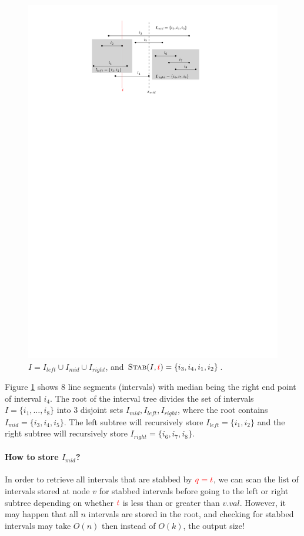 \begin{figure}[ht!]
\centering
\includegraphics[scale=.8]{ipe/stabbing-line.pdf}
\caption{ $I = I_{left} \cup I_{mid} \cup I_{right} $, and $\textsc{Stab}(I, \textcolor{red}{t}) = \{ i_3, i_4, i_1, i_2 \}$.}
\label{fig:stabbing-line}
\end{figure}

Figure \ref{fig:stabbing-line} shows 8 line segments (intervals) with median being the right end point of interval $i_4$.
%
The root of the interval tree divides the set of intervals $I = \{i_1, \dots, i_8\}$ into 3 disjoint sets $I_{mid}, I_{left}, I_{right}$, where the root contains $I_{mid} = \{ i_3, i_4, i_5 \}$.
%
The left subtree will recursively store $I_{left} = \{ i_1, i_2 \}$ and the right subtree will recursively store $I_{right} =\{i_6, i_7, i_8 \}$.
% 
\paragraph{How to store $I_{mid}$?} 
In order to retrieve all intervals that are stabbed by $\textcolor{red}{q = t}$, we can scan the list of intervals stored at node $v$ for stabbed intervals before going to the left or right subtree depending on whether $\textcolor{red}{t}$ is less than or greater than $v.val$.
%
However, it may happen that all $n$ intervals are stored in the root, and checking for stabbed intervals may take $O(n)$ then instead of $O(k)$, the output size!

